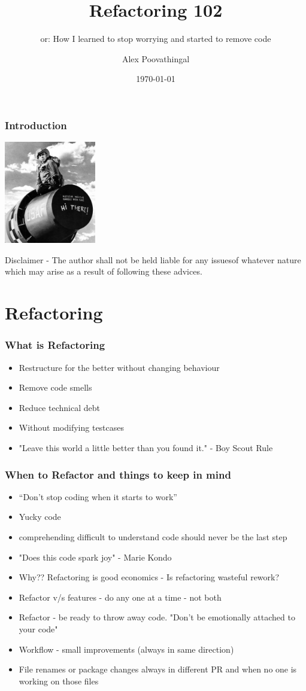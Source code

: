 \documentclass{beamer}
\title{Refactoring 102}
\subtitle{or: How I learned to stop worrying and started to remove code}
\author{Alex Poovathingal}
\institute{Gozefo.com}
\date{\today}
\begin{document}
\frame{
	\titlepage
}

\begin{frame}[fragile]
\frametitle{Introduction}
\begin{center}
\includegraphics[width=4cm]{resources/strangelove.jpg}
\end{center}
Disclaimer - The author shall not be held liable for any issuesof whatever 
nature which may arise as a result of following these advices.
\end{frame}

\section{Refactoring}
\begin{frame}[fragile]
\frametitle{What is Refactoring}
\begin{itemize}
	\pause
	\item Restructure for the better without changing behaviour
	\pause
	\item Remove code smells
	\pause
	\item Reduce technical debt
	\pause
	\item Without modifying testcases
	\pause
	\item "Leave this world a little better than you found it." - Boy Scout Rule
\end{itemize}
\end{frame}

\begin{frame}[fragile]
\frametitle{When to Refactor and things to keep in mind}
\begin{itemize}
	\item “Don’t stop coding when it starts to work”
	\pause
	\item Yucky code
	\pause
	\item comprehending difficult to understand code should never be the last step
	\pause
	\item "Does this code spark joy" - Marie Kondo
	\pause
	\item Why?? Refactoring is good economics - Is refactoring wasteful rework?
	\pause
	\item Refactor v/s features - do any one at a time - not both
	\pause
	\item Refactor - be ready to throw away code. "Don't be emotionally attached to your code"
	\pause
	\item Workflow - small improvements (always in same direction)
	\pause
	\item File renames or package changes always in different PR and when no one is working on those files
\end{itemize}
\end{frame}
\end{document}
